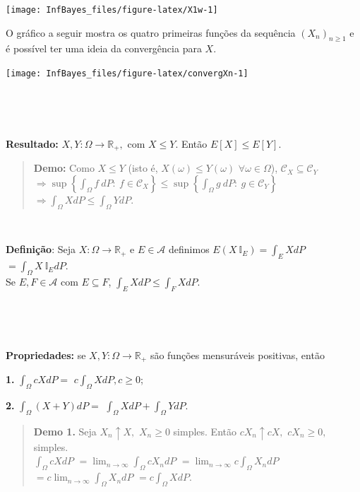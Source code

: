 \documentclass[
]{book}
\begin{document}
\begin{center}\texttt{[image: InfBayes\_files/figure-latex/X1w-1]} \end{center}

O gráfico a seguir mostra os quatro primeiras funções da sequência \(\left(X_n\right)_{n\geq 1}\) e é possível ter uma ideia da convergência para \(X\).

\begin{center}\texttt{[image: InfBayes\_files/figure-latex/convergXn-1]} \end{center}

\(~\)

\(~\)

\textbf{Resultado:} \(X,Y: \Omega \longrightarrow\mathbb{R}_+,\) com \(X\leq Y\). Então \(E[X] \leq E[Y]\).

\begin{quote}
\textbf{Demo:} Como \(X \leq Y\) (isto é, \(X(\omega) \leq Y(\omega)\) \(\forall \omega \in \Omega\)), \(\mathcal{C}_X \subseteq \mathcal{C}_Y\)\\
\(\Rightarrow \sup\left\{\displaystyle\int_\Omega f~dP:~ f\in \mathcal{C}_X\right\} \leq \sup\left\{\displaystyle\int_\Omega g~dP:~ g\in \mathcal{C}_Y\right\}\) \(\Rightarrow \displaystyle\int_\Omega XdP \leq \displaystyle\int_\Omega YdP\).
\end{quote}

\(~\)

\textbf{Definição}: Seja \(X:\Omega \longrightarrow\mathbb{R}_+\) e \(E \in \mathcal{A}\) definimos \(E(X~\mathbb{I}_E) = \displaystyle\int_EXdP\) \(=\displaystyle\int_\Omega X~\mathbb{I}_EdP\).\\
Se \(E,F \in \mathcal{A}\) com \(E\subseteq F\), \(\displaystyle\int_E XdP \leq \int_F XdP.\)

\(~\)

\(~\)

\textbf{Propriedades:} se \(X, Y: \Omega \longrightarrow \mathbb{R}_+\) são funções mensuráveis positivas, então

\textbf{1.} \(\displaystyle\int_\Omega cXdP =\) \(c\displaystyle\int_\Omega XdP, c\geq 0\);

\textbf{2.} \(\displaystyle\int_\Omega (X+Y)dP =\) \(\displaystyle\int_\Omega XdP + \int_\Omega YdP\).

\begin{quote}
\textbf{Demo 1.} Seja \(X_n\uparrow X,\) \(X_n \geq 0\) simples. Então \(cX_n\uparrow cX,\) \(cX_n \geq 0,\) simples.\\
\(\displaystyle\int_\Omega cX dP\) \(=\displaystyle\lim_{n\rightarrow\infty}\int_\Omega cX_n dP\) \(=\displaystyle\lim_{n\rightarrow\infty}c\int_\Omega X_n dP\) \(=\displaystyle c\lim_{n\rightarrow\infty}\int_\Omega X_n dP\) \(=\displaystyle c\int_\Omega X dP\).
\end{quote}
\end{document}
